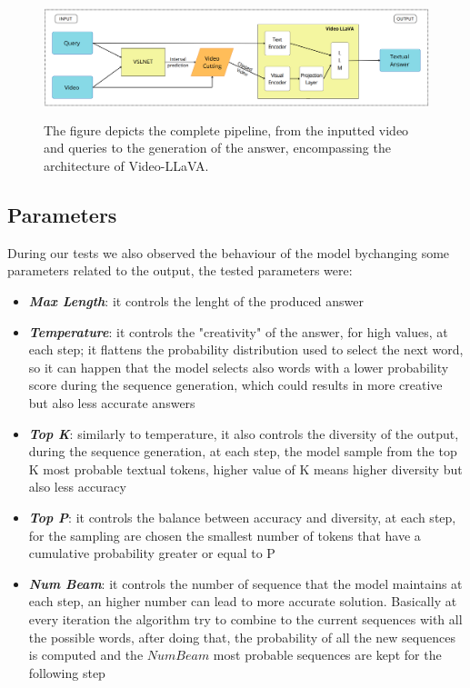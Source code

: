 \documentclass[10pt,twocolumn,letterpaper]{article}
\begin{document}
\begin{figure}
  \includegraphics[width=\textwidth,height=3.5cm]{FinalProposedPipeline.png}
  \caption{The figure depicts the complete pipeline, from the inputted video and queries to the generation of the answer, encompassing the architecture of Video-LLaVA.}
  \label{fig:fullPipeline}
\end{figure}

\subsection{Parameters}
\label{subsec:Parameters}
During our tests we also observed the behaviour of the model bychanging some parameters related to the output, the tested parameters were:

\begin{itemize}
\setlength{\parskip}{0.05cm} 
    \item \textit{\textbf{Max Length}}: it controls the lenght of the produced answer
    \item \textit{\textbf{Temperature}}: it controls the "creativity" of the answer, for high values, at each step; it flattens the probability distribution used to select the next word, so it can happen that the model selects also words with a lower probability score during the sequence generation, which could results in more creative but also less accurate answers
    \item \textit{\textbf{Top K}}: similarly to temperature, it also controls the diversity of the output, during the sequence generation, at each step, the model sample from the top K most probable textual tokens, higher value of K means higher diversity but also less accuracy
    \item \textit{\textbf{Top P}}: it controls the balance between accuracy and diversity, at each step, for the sampling are chosen the smallest number of tokens that have a cumulative probability greater or equal to P
     \item \textit{\textbf{Num Beam}}: it controls the number of sequence that the model maintains at each step, an higher number can lead to more accurate solution. Basically at every iteration the algorithm try to combine to the current sequences with all the possible words, after doing that, the probability of all the new sequences is computed and the $Num Beam$ most probable sequences are kept for the following step
    
\end{itemize}
\end{document}
